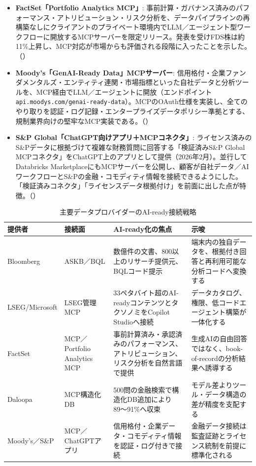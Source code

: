 \begin{itemize}
  \item \textbf{FactSet「Portfolio Analytics MCP」}: 事前計算・ガバナンス済みのパフォーマンス・アトリビューション・リスク分析を、データパイプラインの再構築なしにクライアントのプライベート環境内でLLM／エージェント型ワークフローに開放するMCPサーバーを限定リリース。発表を受けFDS株は約11\%上昇し、MCP対応が市場からも評価される段階に入ったことを示した。（\cite{factset_portfolio_mcp2026}）
  \item \textbf{Moody's「GenAI-Ready Data」MCPサーバー}: 信用格付・企業ファンダメンタルズ・エンティティ連関・市場指標といった自社データと分析ツールを、MCP経由でLLM／エージェントに開放（エンドポイント \texttt{api.moodys.com/genai-ready-data}）。MCPのOAuth仕様を実装し、全てのやり取りを認証・ログ記録・エンタープライズデータポリシー準拠とする、規制業界向けの堅牢なMCP実装である。（\cite{x02moodysmcp2026}）
  \item \textbf{S\&P Global「ChatGPT向けアプリ＋MCPコネクタ」}: ライセンス済みのS\&Pデータに根拠づけて複雑な財務質問に回答する「検証済みS\&P Global MCPコネクタ」をChatGPT上のアプリとして提供（2026年2月）。並行してDatabricks MarketplaceにもMCPサーバーを公開し、顧客が自社データ／AIワークフローとS\&Pの金融・コモディティ情報を接続できるようにした。「検証済みコネクタ」「ライセンスデータ根拠付け」を前面に出した点が特徴。（\cite{x02spglobalmcp2026}）
\end{itemize}

\begin{table}[htbp]
\centering
\small
\caption{主要データプロバイダーのAI-ready接続戦略}
\label{tab:mcp-provider-strategy}
\begin{tabularx}{\textwidth}{@{}l l X X@{}}
\toprule
\textbf{提供者} & \textbf{接続面} & \textbf{AI-ready化の焦点} & \textbf{示唆} \\
\midrule
Bloomberg & ASKB／BQL & 数億件の文書、800以上のリサーチ提供元、BQLコード提示\cite{x02bloombergai2026} & 端末内の独自データを、根拠付き回答と再利用可能な分析コードへ変換する \\
LSEG/Microsoft & LSEG管理MCP & 33ペタバイト超のAI-readyコンテンツとタクソノミをCopilot Studioへ接続\cite{x02lsegmicrosoft2025} & データカタログ、権限、低コードエージェント構築が一体化する \\
FactSet & MCP／Portfolio Analytics MCP & 事前計算済み・承認済みのパフォーマンス、アトリビューション、リスク分析を自然言語で提供\cite{factset_portfolio_mcp2026} & 生成AIの自由回答ではなく、book-of-recordの分析結果へ誘導する \\
Daloopa & MCP構造化DB & 500問の金融検索で構造化DB追加により89〜91\%へ収束\cite{x02daloopabench2026,x02finretrieval2026} & モデル差よりツール・データ構造の差が精度を支配する \\
Moody's／S\&P & MCP／ChatGPTアプリ & 信用格付・企業データ・コモディティ情報を認証・ログ付きで接続\cite{x02moodysmcp2026,x02spglobalmcp2026} & 金融データ接続は監査証跡とライセンス統制を前提に標準化される \\
\bottomrule
\end{tabularx}
\end{table}

